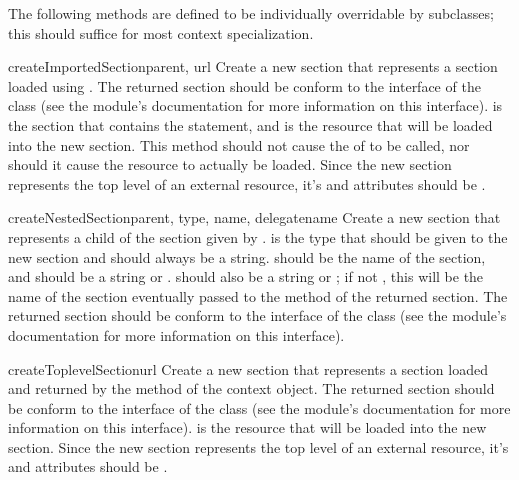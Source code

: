 \documentclass{howto}
\begin{document}
The following methods are defined to be individually overridable by
subclasses; this should suffice for most context specialization.

\begin{methoddesc}{createImportedSection}{parent, url}
  Create a new section that represents a section loaded using
  .  The returned section should be conform to the
  interface of the  class (see the
   module's documentation for more
  information on this interface).   is the section that
  contains the  statement, and  is the
  resource that will be loaded into the new section.  This method
  should not cause the  of  to be
  called, nor should it cause the resource to actually be loaded.
  Since the new section represents the top level of an external
  resource, it's  and  attributes should be
  .
\end{methoddesc}

\begin{methoddesc}{createNestedSection}{parent, type, name, delegatename}
  Create a new section that represents a child of the section given by
  .   is the type that should be given to the
  new section and should always be a string.   should be the
  name of the section, and should be a string or .
   should also be a string or ; if not
  , this will be the name of the section eventually passed
  to the  method of the returned section.  The
  returned section should be conform to the interface of the
   class (see the 
  module's documentation for more information on this interface).
\end{methoddesc}

\begin{methoddesc}{createToplevelSection}{url}
  Create a new section that represents a section loaded and returned
  by the  method of the context object.  The returned
  section should be conform to the interface of the
   class (see the
   module's documentation for more
  information on this interface).   is the resource that will
  be loaded into the new section.
  Since the new section represents the top level of an external
  resource, it's  and  attributes should be
  .
\end{methoddesc}
\end{document}
